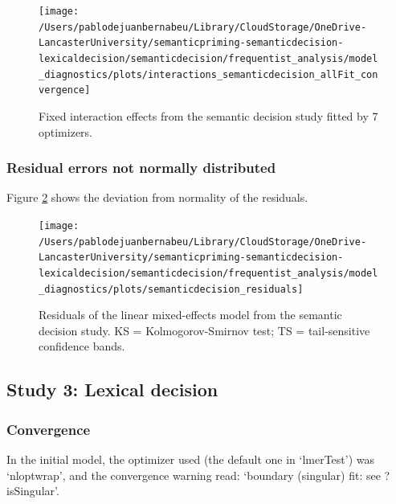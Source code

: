 \documentclass[
  12pt,
  man,floatsintext]{apa7}
\begin{document}
\begin{figure}

{\centering \texttt{[image: /Users/pablodejuanbernabeu/Library/CloudStorage/OneDrive-LancasterUniversity/semanticpriming-semanticdecision-lexicaldecision/semanticdecision/frequentist\_analysis/model\_diagnostics/plots/interactions\_semanticdecision\_allFit\_convergence]} 

}

\caption{Fixed interaction effects from the semantic decision study fitted by 7 optimizers.}\label{fig:interactions-semanticdecision-allFit-convergence}
\end{figure}

\hypertarget{residual-errors-not-normally-distributed-3}{%
\subsubsection{Residual errors not normally distributed}\label{residual-errors-not-normally-distributed-3}}

Figure \ref{fig:semanticdecision-residuals} shows the deviation from normality of the residuals.

\begin{figure}

{\centering \texttt{[image: /Users/pablodejuanbernabeu/Library/CloudStorage/OneDrive-LancasterUniversity/semanticpriming-semanticdecision-lexicaldecision/semanticdecision/frequentist\_analysis/model\_diagnostics/plots/semanticdecision\_residuals]} 

}

\caption{Residuals of the linear mixed-effects model from the semantic decision study. \linebreak KS = Kolmogorov-Smirnov test; TS = tail-sensitive confidence bands.}\label{fig:semanticdecision-residuals}
\end{figure}

\hypertarget{study-3-lexical-decision-2}{%
\subsection{Study 3: Lexical decision}\label{study-3-lexical-decision-2}}

\hypertarget{convergence-2}{%
\subsubsection{Convergence}\label{convergence-2}}

In the initial model, the optimizer used (the default one in `lmerTest') was `nloptwrap', and the convergence warning read: `boundary (singular) fit: see ?isSingular'.
\end{document}
